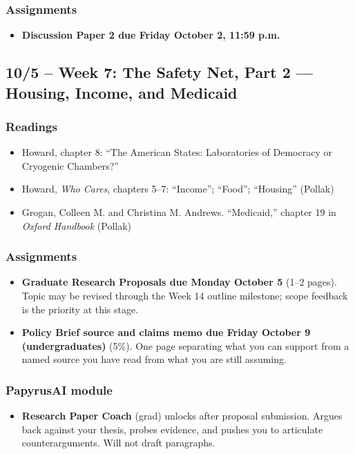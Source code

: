 \documentclass[12pt]{article}
\begin{document}
    \subsubsection*{Assignments}
        \begin{itemize}
            \item \textbf{Discussion Paper 2 due Friday October 2, 11:59 p.m.}
        \end{itemize}

\subsection*{10/5 -- Week 7: The Safety Net, Part 2 --- Housing, Income, and Medicaid}
    \subsubsection*{Readings}
        \begin{itemize}
            \item Howard, chapter 8: ``The American States: Laboratories of Democracy or Cryogenic Chambers?''
            \item Howard, \emph{Who Cares}, chapters 5--7: ``Income''; ``Food''; ``Housing'' (Pollak)
            \item Grogan, Colleen M. and Christina M. Andrews. ``Medicaid,'' chapter 19 in \emph{Oxford Handbook} (Pollak)
        \end{itemize}
    \subsubsection*{Assignments}
        \begin{itemize}
            \item \textbf{Graduate Research Proposals due Monday October 5} (1--2 pages). Topic may be revised through the Week 14 outline milestone; scope feedback is the priority at this stage.
            \item \textbf{Policy Brief source and claims memo due Friday October 9 (undergraduates)} (5\%). One page separating what you can support from a named source you have read from what you are still assuming.
        \end{itemize}
    \subsubsection*{PapyrusAI module}
        \begin{itemize}
            \item \textbf{Research Paper Coach} (grad) unlocks after proposal submission. Argues back against your thesis, probes evidence, and pushes you to articulate counterarguments. Will not draft paragraphs.
        \end{itemize}
\end{document}
